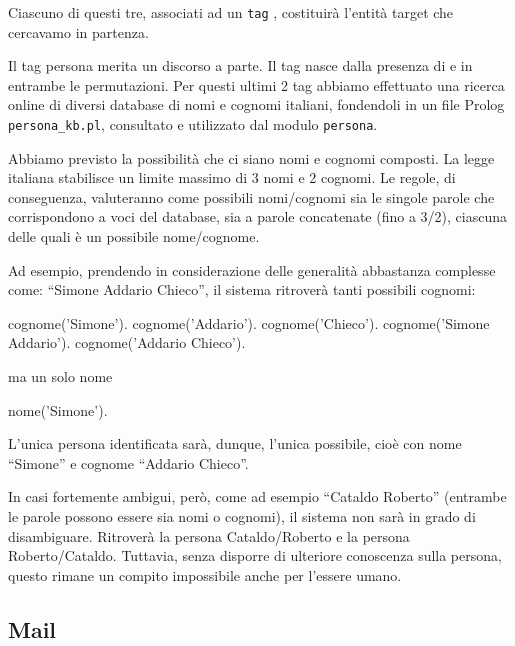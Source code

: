 Ciascuno di questi tre, associati ad un \verb|tag| , costituirà l'entità target che cercavamo in partenza.

Il tag persona merita un discorso a parte.
Il tag  nasce dalla presenza di  e  in entrambe le permutazioni.
Per questi ultimi 2 tag abbiamo effettuato una ricerca online di diversi database di nomi e cognomi italiani, fondendoli in un file Prolog \verb|persona_kb.pl|, consultato e utilizzato dal modulo \verb|persona|.

Abbiamo previsto la possibilità che ci siano nomi e cognomi composti. La legge italiana stabilisce un limite massimo di 3 nomi e 2 cognomi.
Le regole, di conseguenza, valuteranno come possibili nomi/cognomi sia le singole parole che corrispondono a voci del database, sia a parole concatenate (fino a 3/2), ciascuna delle quali è un possibile nome/cognome.

Ad esempio, prendendo in considerazione delle generalità abbastanza complesse come: ``Simone Addario Chieco'', il sistema ritroverà tanti possibili cognomi:

\begin{prologcode}
cognome('Simone').
cognome('Addario').
cognome('Chieco').
cognome('Simone Addario').
cognome('Addario Chieco').
\end{prologcode}

ma un solo nome

\begin{prologcode}
nome('Simone').
\end{prologcode}

L'unica persona identificata sarà, dunque, l'unica possibile, cioè con nome ``Simone'' e cognome ``Addario Chieco''.

In casi fortemente ambigui, però, come ad esempio ``Cataldo Roberto'' (entrambe le parole possono essere sia nomi o cognomi), il sistema non sarà in grado di disambiguare. Ritroverà la persona Cataldo/Roberto e la persona Roberto/Cataldo. Tuttavia, senza disporre di ulteriore conoscenza sulla persona, questo rimane un compito impossibile anche per l'essere umano.

\subsection{}

\subsection{Mail}
